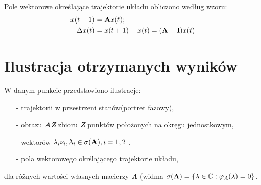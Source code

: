 \documentclass{article}
\begin{document}
Pole wektorowe okre\'slające trajektorie układu obliczono według wzoru:
\begin{gather*}
\begin{aligned}
x(t+1)&=\bold{A}x(t); \\
\Delta x(t) &= x(t+1) - x(t) = (\bold{A-I})x(t)
\end{aligned}
\end{gather*}

\section{Ilustracja otrzymanych wyników}

W danym punkcie przedstawiono ilustracje: 
\begin{itemize}
\item[-] trajektorii w przestrzeni stanów(portret fazowy),
\item[-] obrazu \textit{\textbf{AZ}} zbioru \textit{\textbf{Z}} punktów położonych na okręgu jednostkowym, 
\item[-] wektorów $\lambda_i\nu_i , \lambda_i \in \sigma(\bold {A}) , i =1,2$ ,
\item[-] pola wektorowego okr\'slającego trajektorie układu,
\end{itemize}
dla różnych warto\'sci własnych macierzy \textit{\textbf{A}} (widma $\sigma(\bold{A}) = \{ \lambda \in \mathbb{C} : \varphi_A(\lambda) = 0 \}$.
\end{document}
